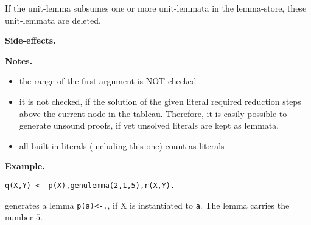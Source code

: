If the unit-lemma subsumes one or more unit-lemmata in the lemma-store,
these unit-lemmata are deleted.

 
 
 

\vspace*{0.5cm}
\noindent
{\bf Side-effects.}

\vspace*{0.5cm}
\noindent
{\bf Notes.}
\begin{itemize}
\item
the range of the first argument is NOT checked
\item
it is not checked, if the solution of the given literal required
reduction steps above the current node in the tableau.
Therefore, it is easily possible to generate unsound proofs, if
yet unsolved literals are kept as lemmata.
\item
all built-in literals (including this one) count as literals
\end{itemize}

\vspace*{0.5cm}
\noindent
{\bf Example.}
\begin{verbatim}
q(X,Y) <- p(X),genulemma(2,1,5),r(X,Y).
\end{verbatim}
 
generates a lemma {\tt p(a)<-.}, if X is instantiated to {\tt a}.
The lemma carries the number $5$.
 


